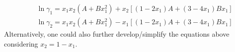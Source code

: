 \documentclass[calculator,allquestions,datasheet,solutions]{exam_newMarcus2}
\begin{document}
\begin{question}
\begin{enumerate}[(a)]
{             \begin{eqnarray}
                  && \ln{\gamma_{1}} = x_{1}x_{2}\left(A+Bx_{1}^{2}\right) + x_{2}\left[\left(1-2x_{1}\right)A + \left(3-4x_{1}\right)Bx_{1}\right] \nonumber \\
                  && \ln{\gamma_{2}} = x_{1}x_{2}\left(A+Bx_{1}^{2}\right) - x_{1}\left[\left(1-2x_{1}\right)A + \left(3-4x_{1}\right)Bx_{1}\right] \nonumber 
             \end{eqnarray}
             Alternatively, one could also further develop/simplify the equations above considering $x_{2}=1-x_{1}$.
                
}
%
   \end{enumerate}
%
\end{question}

\clearpage
\end{document}

